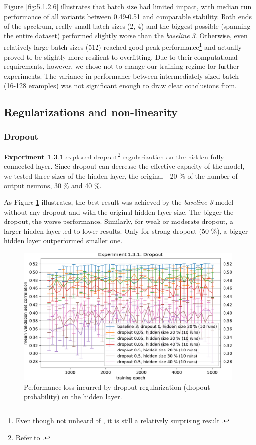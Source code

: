 Figure \ref{fig:5.1.2.6} illustrates that batch size had limited impact, with median run performance of all variants between 0.49-0.51 and comparable stability. Both ends of the spectrum, really small batch sizes (2, 4) and the biggest possible (spanning the entire dataset) performed slightly worse than the \textit{baseline 3}. Otherwise, even relatively large batch sizes (512) reached good peak performance\footnote{Even though not unheard of \citep{2017arXiv171100489S}, it is still a relatively surprising result \citep{2017arXiv170508741H}.} and actually proved to be slightly more resilient to overfitting. Due to their computational requirements, however, we chose not to change our training regime for further experiments. The variance in performance between intermediately sized batch (16-128 examples) was not significant enough to draw clear conclusions from.

\subsection{Regularizations and non-linearity}
\subsubsection{Dropout}

\textbf{Experiment 1.3.1} explored dropout\footnote{Refer to .} regularization on the hidden fully connected layer. Since dropout can decrease the effective capacity of the model, we tested three sizes of the hidden layer, the original - 20 \% of the number of output neurons, 30 \% and 40 \%. 

As Figure \ref{fig:5.1.3.1} illustrates, the best result was achieved by the \textit{baseline 3} model without any dropout and with the original hidden layer size. The bigger the dropout, the worse performance. Similarly, for weak or moderate dropout, a larger hidden layer led to lower results. Only for strong dropout (50 \%), a bigger hidden layer outperformed smaller one.

\begin{figure}[H]
    \centering
    \includegraphics[width=1\textwidth]{../figures/05_1_3_1}
    \caption[Experiment 1.3.1]{Performance loss incurred by dropout regularization (dropout probability) on the hidden layer.}
    \label{fig:5.1.3.1}
\end{figure}

